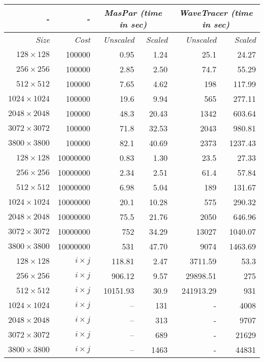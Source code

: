 \begin{table}
\begin{center}
\begin{tabular}{|r|r|r|r|r|r|} \hline \hline
- & - & 
\multicolumn{2}{c|}{\em MasPar (time in sec)} &
\multicolumn{2}{c|}{\em WaveTracer (time in sec)} \\ \hline
{\em Size} & {\em Cost} & {\em Unscaled} & {\em Scaled} & {\em Unscaled} & {\em Scaled} \\ \hline  
$128  \times  128$ & 100000     &  0.95 &  1.24 &   25.1 & 24.27  \\ \hline
$256  \times  256$ & 100000     &  2.85 &  2.50 &   74.7 & 55.29  \\ \hline
$512  \times  512$ & 100000     &  7.65 &  4.62 &    198 & 117.99 \\ \hline
$1024 \times 1024$ & 100000     &  19.6 &  9.94 &    565 & 277.11 \\ \hline
$2048 \times 2048$ & 100000     &  48.3 &  20.43&   1342 & 603.64 \\ \hline
$3072 \times 3072$ & 100000     &  71.8 &  32.53&   2043 & 980.81 \\ \hline
$3800 \times 3800$ & 100000     &  82.1 &  40.69&   2373 &1237.43 \\ \hline \hline

$128  \times  128$ & 10000000   &   0.83 & 1.30 &   23.5 & 27.33  \\ \hline
$256  \times  256$ & 10000000   &   2.34 & 2.51 &   61.4 & 57.84  \\ \hline
$512  \times  512$ & 10000000   &   6.98 & 5.04 &    189 & 131.67  \\ \hline
$1024 \times 1024$ & 10000000   &   20.1 & 10.28&    575 & 290.32 \\ \hline
$2048 \times 2048$ & 10000000   &   75.5 & 21.76&   2050 & 646.96 \\ \hline
$3072 \times 3072$ & 10000000   &    752 & 34.29&  13027 & 1040.07\\ \hline
$3800 \times 3800$ & 10000000   &    531 & 47.70&   9074 & 1463.69\\ \hline \hline

$128  \times  128$ & $i \times j$ &   118.81&    2.47 & 3711.59 &  53.3 \\ \hline
$256  \times  256$ & $i \times j$ &   906.12&    9.57 & 29898.51 &   275 \\ \hline
$512  \times  512$ & $i \times j$ & 10151.93&    30.9 & 241913.29 &   931 \\ \hline
$1024 \times 1024$ & $i \times j$ & --      &     131 & - &  4008 \\ \hline
$2048 \times 2048$ & $i \times j$ & --      &     313 & - &  9707 \\ \hline
$3072 \times 3072$ & $i \times j$ & --      &     689 & - & 21629 \\ \hline
$3800 \times 3800$ & $i \times j$ & --      &    1463 & - & 44831 \\ \hline \hline


\end{tabular}
\end{center}
\end{table}
